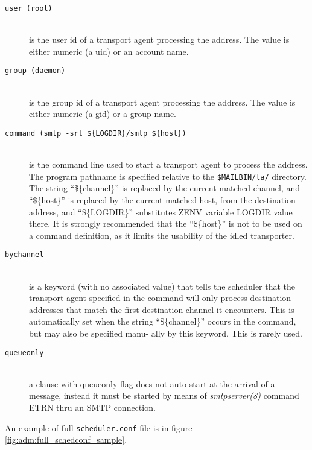 \begin{description}
\item[\tt user \rm(root)]\mbox{}\\
is  the  user  id  of  a transport agent processing the
address.  The value is either numeric  (a  uid)  or  an
account name.

\item[\tt group \rm(daemon)]\mbox{}\\
is  the  group  id  of a transport agent processing the
address.  The value is either  numeric  (a  gid)  or a
group name.

\item[\tt command \rm(smtp -srl \$\{LOGDIR\}/smtp \$\{host\})]\mbox{}\\
is  the command line used to start a transport agent to
process the address. The program pathname is specified
relative  to the  {\tt \$MAILBIN/ta/}  directory.   The  string
``\$\{channel\}'' is replaced by the current matched  channel,
and  ``\$\{host\}'' is  replaced by the current matched host,
from the destination address, and ``\$\{LOGDIR\}'' substitutes
ZENV variable LOGDIR value there.  It is strongly 
recommended that the ``\$\{host\}'' is not to be used on a command
definition, as it limits the usability of the idled transporter.

\item[\tt bychannel]\mbox{}\\
is a keyword (with no associated value) that tells  the
scheduler  that  the transport  agent specified in the
command will only process  destination  addresses  that
match  the  first  destination  channel  it encounters.
This is automatically set when  the  string  ``\$\{channel\}''
occurs  in the command, but may also be specified manu-
ally by this keyword.  This is rarely used.

\item[\tt queueonly]\mbox{}\\
a clause with queueonly flag does not auto-start at the
arrival  of  a  message,  instead it must be started by
means of {\em smtpserver(8)} command ETRN thru an  SMTP  connection.

\end{description}

An example of full {\tt scheduler.conf} file is in
figure \vref{fig:adm:full_schedconf_sample}.

